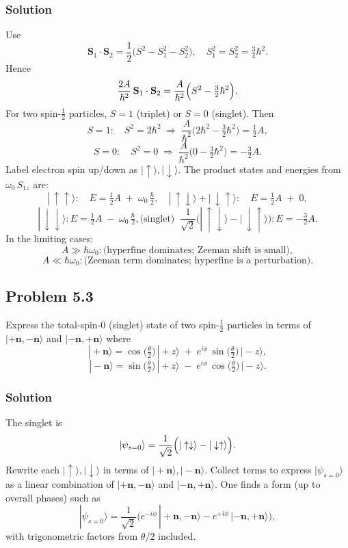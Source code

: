 \documentclass[twocolumn]{article}
\begin{document}
\begin{spacing}{1}
\subsubsection*{Solution}
Use
\[
\mathbf{S}_1 \cdot \mathbf{S}_2 
= \frac{1}{2}\bigl(S^2 - S_1^2 - S_2^2\bigr),
\quad
S_1^2 = S_2^2 = \tfrac{3}{4}\hbar^2.
\]
Hence
\[
\frac{2A}{\hbar^2}\,\mathbf{S}_1 \cdot \mathbf{S}_2
= \frac{A}{\hbar^2}\Bigl(S^2 - \tfrac{3}{2}\hbar^2\Bigr).
\]
For two spin-$\tfrac12$ particles, $S=1$ (triplet) or $S=0$ (singlet). Then
\[
S=1:\quad S^2 = 2\hbar^2 
\;\Longrightarrow\; 
\frac{A}{\hbar^2}\bigl(2\hbar^2 - \tfrac{3}{2}\hbar^2\bigr)
= \tfrac12 A,
\]
\[
S=0:\quad S^2 = 0 
\;\Longrightarrow\; 
\frac{A}{\hbar^2}\bigl(0 - \tfrac{3}{2}\hbar^2\bigr)
= -\tfrac{3}{2}A.
\]
Label electron spin up/down as $|\!\uparrow\rangle,|\!\downarrow\rangle$. The product states and energies from $\omega_0\,S_{1z}$ are:
\[
|\,\uparrow\uparrow\rangle:\quad E = \tfrac12 A \;+\;\omega_0\,\tfrac{\hbar}{2},
\quad
|\,\uparrow\downarrow\rangle + |\,\downarrow\uparrow\rangle:\quad E = \tfrac12 A \;+\;0,
\]
\[
|\,\downarrow\downarrow\rangle: E = \tfrac12 A \;-\;\omega_0\,\tfrac{\hbar}{2},
\text{(singlet)}\;\; 
\frac{1}{\sqrt{2}}\bigl(|\,\uparrow\downarrow\rangle - |\,\downarrow\uparrow\rangle\bigr):
E = -\tfrac{3}{2}A.
\]
In the limiting cases:
\[
A \gg \hbar\omega_0: \text{(hyperfine dominates; Zeeman shift is small)},
\]
\[
A \ll \hbar\omega_0: \text{(Zeeman term dominates; hyperfine is a perturbation)}.
\]

\subsection{Problem 5.3}
Express the total-spin-$0$ (singlet) state of two spin-$\tfrac12$ particles in terms of 
\(
|+\mathbf{n},-\mathbf{n}\rangle
\)
and 
\(
|-\mathbf{n},+\mathbf{n}\rangle
\)
where
\[
|\!+\mathbf{n}\rangle
= \cos\!\bigl(\tfrac{\theta}{2}\bigr)\,|\!+z\rangle 
\;+\; e^{i\phi}\,\sin\!\bigl(\tfrac{\theta}{2}\bigr)\,|\!-z\rangle,
\]
\[
|\!-\mathbf{n}\rangle
= \sin\!\bigl(\tfrac{\theta}{2}\bigr)\,|\!+z\rangle
\;-\; e^{i\phi}\,\cos\!\bigl(\tfrac{\theta}{2}\bigr)\,|\!-z\rangle.
\]

\subsubsection*{Solution}
The singlet is
\[
|\psi_{s=0}\rangle 
= \frac{1}{\sqrt{2}}
\Bigl(
|\uparrow\downarrow\rangle 
- |\downarrow\uparrow\rangle
\Bigr).
\]
Rewrite each $|\uparrow\rangle,|\downarrow\rangle$ in terms of $|\!+\mathbf{n}\rangle,|\!-\mathbf{n}\rangle$. Collect terms to express 
\(
|\psi_{s=0}\rangle
\)
as a linear combination of 
\(
|+\mathbf{n},-\mathbf{n}\rangle
\)
and
\(
|-\mathbf{n},+\mathbf{n}\rangle
\).
One finds a form (up to overall phases) such as
\[
|\psi_{s=0}\rangle
= \frac{1}{\sqrt{2}}
\bigl(
e^{-i\phi}\,|+\mathbf{n},-\mathbf{n}\rangle
- e^{+i\phi}\,|-\mathbf{n},+\mathbf{n}\rangle
\bigr),
\]
with trigonometric factors from $\theta/2$ included.  


\end{spacing}
\end{document}
